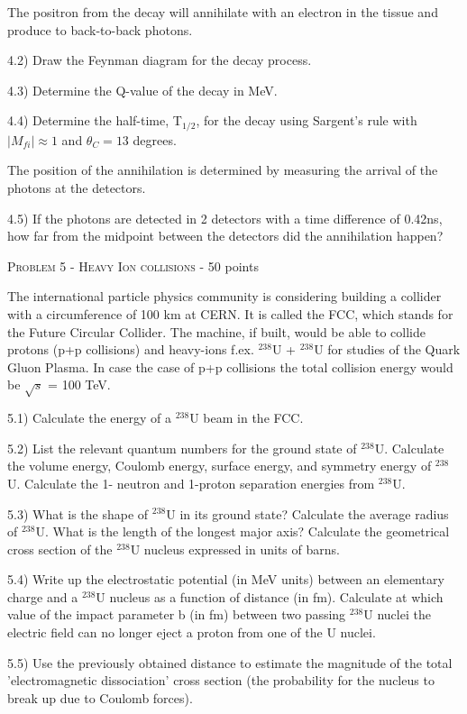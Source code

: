 \documentclass[a4paper,11pt]{report}
\begin{document}
The positron from the decay will annihilate with an electron in the tissue and produce to back-to-back photons.

4.2) Draw the Feynman diagram for the decay process.

4.3) Determine the Q-value of the decay in MeV.

4.4) Determine the half-time, T$_{1/2}$, for the decay using Sargent's rule with $|M_{fi}|\approx 1$ and $\theta_C = 13$ degrees.

The position of the annihilation is determined by measuring the arrival of the photons at the detectors. 

4.5) If the photons are detected in 2 detectors with a time difference of 0.42ns, how far from the midpoint between the detectors did the annihilation happen?

\vspace{1cm}

{\large \textsc{Problem 5 - Heavy Ion collisions} - 50 points}

The international particle physics community is considering building a collider with a circumference of 100 km at CERN. It is called the FCC, which stands for the Future Circular Collider. The machine, if built, would be able to collide protons (p+p collisions) and heavy-ions f.ex. $^{238}$U + $^{238}$U for studies of the Quark Gluon Plasma. In case the case of p+p collisions the total collision energy would be $\sqrt{s}$ = 100 TeV.

5.1) Calculate the energy of a $^{238}$U beam in the FCC.

5.2) List the relevant quantum numbers for the ground state of $^{238}$U. Calculate the volume energy, Coulomb energy, surface energy, and symmetry energy of $^{238}$U. Calculate the 1- neutron and 1-proton separation energies from $^{238}$U.

5.3) What is the shape of $^{238}$U in its ground state? Calculate the average radius of $^{238}$U. What is the length of the longest major axis? Calculate the geometrical cross section of the $^{238}$U nucleus expressed in units of barns.
 
5.4) Write up the electrostatic potential (in MeV units) between an elementary charge and a $^{238}$U nucleus as a function of distance (in fm). Calculate at which value of the impact parameter b (in fm) between two passing $^{238}$U nuclei the electric field can no longer eject a proton from one of the U nuclei.

5.5) Use the previously obtained distance to estimate the magnitude of the total ’electromagnetic dissociation’ cross section (the probability for the nucleus to break up due to Coulomb forces).
\end{document}
